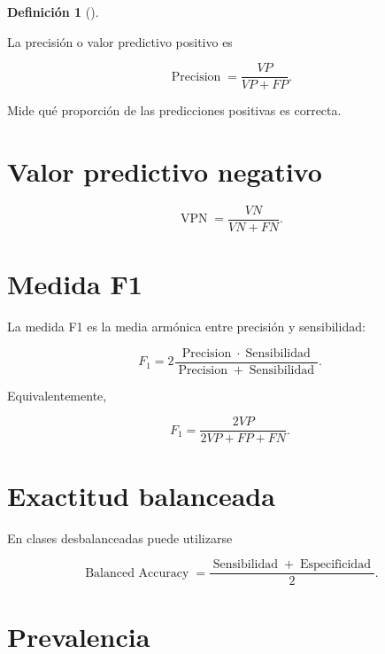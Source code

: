\documentclass[
  spanish,
  10.5pt,
  letterpaper,
  DIV=11,
  numbers=noendperiod,
  oneside,
  open=any]{scrreprt}
\theoremstyle{definition}
\newtheorem{definition}{Definición}[chapter]
\theoremstyle{definition}
\theoremstyle{plain}
\theoremstyle{remark}
\begin{document}

\begin{definition}[]\protect\hypertarget{def-precision}{}\label{def-precision}

La precisión o valor predictivo positivo es

\[
\operatorname{Precision}
=
\frac{
VP
}{
VP+FP
}.
\]

\end{definition}

Mide qué proporción de las predicciones positivas es correcta.

\section*{Valor predictivo negativo}\label{valor-predictivo-negativo}


\[
\operatorname{VPN}
=
\frac{
VN
}{
VN+FN
}.
\]

\section*{Medida F1}\label{medida-f1}


La medida F1 es la media armónica entre precisión y sensibilidad:

\[
F_1
=
2
\frac{
\operatorname{Precision}
\cdot
\operatorname{Sensibilidad}
}{
\operatorname{Precision}
+
\operatorname{Sensibilidad}
}.
\]

Equivalentemente,

\[
F_1
=
\frac{
2VP
}{
2VP+FP+FN
}.
\]

\section*{Exactitud balanceada}\label{exactitud-balanceada}


En clases desbalanceadas puede utilizarse

\[
\operatorname{Balanced\ Accuracy}
=
\frac{
\operatorname{Sensibilidad}
+
\operatorname{Especificidad}
}{
2
}.
\]

\section*{Prevalencia}\label{prevalencia}
\end{document}
